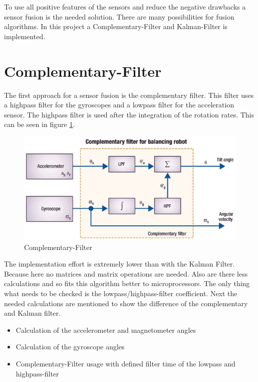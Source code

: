 To use all positive features of the sensors and reduce the negative drawbacks a sensor fusion is the needed solution. There are many possibilities for fusion algorithms. In this project a Complementary-Filter and Kalman-Filter is implemented.

\newpage
\section{Complementary-Filter}
\label{sec:ComplementaryFilter}

The first approach for a sensor fusion is the complementary filter. This filter uses a highpass filter for the gyroscopes and a lowpass filter for the acceleration sensor. The highpass filter is used after the integration of the rotation rates. This can be seen in figure \ref{fig:complementary}.\\
\begin{figure}[H]
	\centering\includegraphics[width=1\textwidth]{fig/Kal_Comp/Complementary.jpg}
	\caption{Complementary-Filter\cite{doc:STM}}
	\label{fig:complementary}
\end{figure}
The implementation effort is extremely lower than with the Kalman Filter. Because here no matrices and matrix operations are needed. Also are there less calculations and so fits this algorithm better to microprocessors. The only thing what needs to be checked is the lowpass/highpass-filter coefficient. Next the needed calculations are mentioned to show the difference of the complementary and Kalman filter.
\begin{itemize}
	\item Calculation of the accelerometer and magnetometer angles
	\item Calculation of the gyroscope angles
	\item Complementary-Filter usage with defined filter time of the lowpass and highpass-filter
\end{itemize}


